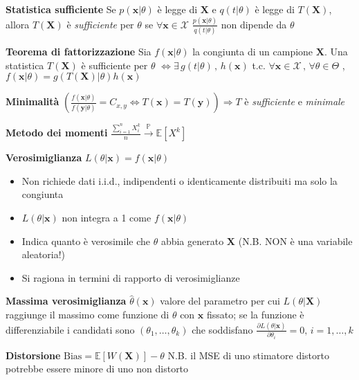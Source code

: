 \documentclass[openany]{book} %
\begin{document}
\textbf{Statistica sufficiente} Se $p(\boldsymbol{x}|\theta)$ è legge di $\boldsymbol{X}$ e $q(t|\theta)$ è legge di $T(\boldsymbol{X})$, allora $T(\boldsymbol{X})$ è \textit{sufficiente} per $\theta$ se $\forall \boldsymbol{x}\in \mathcal{X}$ $\frac{p(\boldsymbol{x}|\theta)}{q(t|\theta)}$ non dipende da $\theta$

\textbf{Teorema di fattorizzazione} Sia $f(\boldsymbol{x}|\theta)$ la congiunta di un campione $\boldsymbol{X}$. Una statistica $T(\boldsymbol{X})$ è sufficiente per $\theta$ $\Leftrightarrow \exists \,g(t|\theta)\,,\,h(\boldsymbol{x})$ t.c. $\forall \boldsymbol{x}\in \mathcal{X}\,,\,\forall \theta\in\Theta$ , $f(\boldsymbol{x}|\theta)=g(T(\boldsymbol{X})|\theta)h(\boldsymbol{x})$

\textbf{Minimalità} $(\frac{f(\boldsymbol{x}|\theta)}{f(\boldsymbol{y}|\theta)}=C_{x,y}\Leftrightarrow T(\boldsymbol{x})=T(\boldsymbol{y}))\Rightarrow T$ è \textit{sufficiente} e \textit{minimale}

\textbf{Metodo dei momenti} $\frac{\sum_{i=1}^nX_i^k}{n}\overset{\mathbb{P}}{\rightarrow}\mathbb{E}[X^k]$

\textbf{Verosimiglianza} $L(\theta|\boldsymbol{x})=f(\boldsymbol{x}|\theta)$

\begin{itemize}

\item Non richiede dati i.i.d., indipendenti o identicamente distribuiti ma solo la congiunta

\item $L(\theta|\boldsymbol{x})$ non integra a 1 come $f(\boldsymbol{x}|\theta)$

\item Indica quanto è verosimile che $\theta$ abbia generato $\boldsymbol{X}$ (N.B. NON è una variabile aleatoria!)

\item Si ragiona in termini di rapporto di verosimiglianze

\end{itemize}

\textbf{Massima verosimiglianza} $\hat\theta(\boldsymbol{x})$ valore del parametro per cui $L(\theta|\boldsymbol{X})$ raggiunge il massimo come funzione di $\theta$ con $\boldsymbol{x}$ fissato; se la funzione è differenziabile i candidati sono $(\theta_1,\dots,\theta_k)$ che soddisfano $\frac{\partial L(\theta|\boldsymbol{x})}{\partial\theta_i}=0,\,i=1,\dots,k$

\textbf{Distorsione} $\text{Bias}=\mathbb{E}[W(\boldsymbol{X})]-\theta$ N.B. il MSE di uno stimatore distorto potrebbe essere minore di uno non distorto
\end{document}
